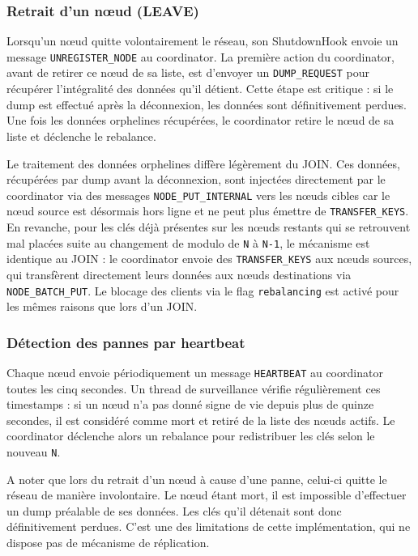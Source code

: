 \subsubsection{Retrait d’un nœud (LEAVE)}

Lorsqu'un nœud quitte volontairement le réseau, son ShutdownHook envoie un message \texttt{UNREGISTER\_NODE} au coordinator. La première action du coordinator, avant de retirer ce nœud de sa liste, est d'envoyer un \texttt{DUMP\_REQUEST} pour récupérer l'intégralité des données qu'il détient. Cette étape est critique : si le dump est effectué après la déconnexion, les données sont définitivement perdues. Une fois les données orphelines récupérées, le coordinator retire le nœud de sa liste et déclenche le rebalance.

Le traitement des données orphelines diffère légèrement du JOIN. Ces données, récupérées par dump avant la déconnexion, sont injectées directement par le coordinator via des messages \texttt{NODE\_PUT\_INTERNAL} vers les nœuds cibles car le nœud source est désormais hors ligne et ne peut plus émettre de \texttt{TRANSFER\_KEYS}. En revanche, pour les clés déjà présentes sur les nœuds restants qui se retrouvent mal placées suite au changement de modulo de \texttt{N} à \texttt{N-1}, le mécanisme est identique au JOIN : le coordinator envoie des \texttt{TRANSFER\_KEYS} aux nœuds sources, qui transfèrent directement leurs données aux nœuds destinations via \texttt{NODE\_BATCH\_PUT}. Le blocage des clients via le flag \texttt{rebalancing} est activé pour les mêmes raisons que lors d'un JOIN.

\subsubsection{Détection des pannes par heartbeat}

Chaque nœud envoie périodiquement un message \texttt{HEARTBEAT} au coordinator toutes les cinq secondes. Un thread de surveillance vérifie régulièrement ces timestamps : si un nœud n'a pas donné signe de vie depuis plus de quinze secondes, il est considéré comme mort et retiré de la liste des nœuds actifs. Le coordinator déclenche alors un rebalance pour redistribuer les clés selon le nouveau \texttt{N}.

A noter que lors du retrait d’un nœud à cause d’une panne, celui-ci quitte le réseau de manière involontaire. Le nœud étant mort, il est impossible d'effectuer un dump préalable de ses données. Les clés qu'il détenait sont donc définitivement perdues. C'est une des limitations de cette implémentation, qui ne dispose pas de mécanisme de réplication.


